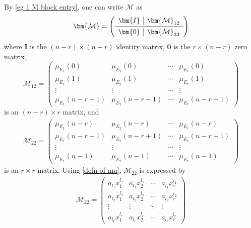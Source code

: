\documentclass[a4paper,10pt,leqno]{amsart}
\numberwithin{equation}{section}
\theoremstyle{remark}
\begin{document}
By \eqref{eg 1 M block entry}, one can write $\bm{\mathcal{M}}$ as
\[
\bm{\mathcal{M}} = \begin{pmatrix}
\begin{array}{c|c}
    \bm{I}      & \bm{\mathcal{M}}_{12} \\
    \noalign{\vskip 2pt\hrule\vskip 2pt}
    \bm{0} & \bm{\mathcal{M}}_{22}
\end{array}
\end{pmatrix}
\]
where $\bm I$ is the $(n-r)\times(n-r)$ identity matrix, $\bm{0}$ is the $r \times (n-r)$ zero matrix,
\[
\bm{\mathcal{M}}_{12} = \begin{pmatrix}
        \mu_{E_{1}}(0)     & \mu_{E_{2}}(0)     & \cdots & \mu_{E_{r}}(0)     \\
        \mu_{E_{1}}(1)     & \mu_{E_{2}}(1)     & \cdots & \mu_{E_{r}}(1)     \\
        \vdots             & \vdots             & \cdots & \vdots             \\
        \mu_{E_{1}}(n-r-1) & \mu_{E_{2}}(n-r-1) & \cdots & \mu_{E_{r}}(n-r-1)
\end{pmatrix}
\]
is an $(n-r) \times r$ matrix, and
\begin{align}
\bm{\mathcal{M}}_{22} = \begin{pmatrix}
\mu_{E_{1}}(n-r)   & \mu_{E_{2}}(n-r)   & \cdots & \mu_{E_{r}}(n-r)    \\
\mu_{E_{1}}(n-r+1) & \mu_{E_{2}}(n-r+1) & \cdots & \mu_{E_{r}}(n-r+1)\\
\vdots             & \vdots             & \cdots & \vdots             \\
\mu_{E_{1}}(n-1)   & \mu_{E_{2}}(n-1)   & \cdots & \mu_{E_{r}}(n-1)    
\end{pmatrix}
\end{align}
is an $r \times r$ matrix. Using \eqref{defn of mu}, $\bm{\mathcal{M}}_{22}$ is expressed by
\begin{align} \label{eg 1 M22}
\bm{\mathcal{M}}_{22} = \begin{pmatrix}
    a_{l_1} x_1^{l_1} & a_{l_1} x_2^{l_1} & \cdots & a_{l_1} x_r^{l_1}\\
    a_{l_2} x_1^{l_2} & a_{l_2} x_2^{l_2} & \cdots & a_{l_2} x_r^{l_2}\\
    \vdots            & \vdots            & \ddots & \vdots           \\
    a_{l_r} x_1^{l_r} & a_{l_r} x_2^{l_r} & \cdots & a_{l_r} x_r^{l_r}
\end{pmatrix}
\end{align}
\end{document}
